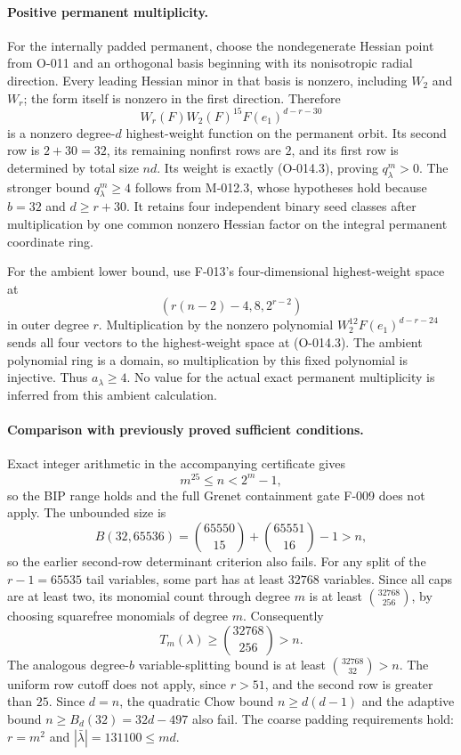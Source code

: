 \paragraph{Positive permanent multiplicity.}
For the internally padded permanent, choose the nondegenerate
Hessian point from O-011 and an orthogonal basis beginning
with its nonisotropic radial direction. Every leading Hessian
minor in that basis is nonzero, including $W_2$ and $W_r$;
the form itself is nonzero in the first direction. Therefore
\[
                    W_r(F)W_2(F)^{15}F(e_1)^{d-r-30}
                                                               \tag{O-014.6}
\]
is a nonzero degree-$d$ highest-weight function on the
permanent orbit. Its second row is $2+30=32$, its remaining
nonfirst rows are $2$, and its first row is determined by
total size $nd$. Its weight is exactly (O-014.3), proving
$q^m_\lambda>0$. The stronger bound $q^m_\lambda\geq4$
follows from M-012.3, whose hypotheses hold because $b=32$
and $d\geq r+30$. It retains four independent binary seed
classes after multiplication by one common nonzero Hessian
factor on the integral permanent coordinate ring.

For the ambient lower bound, use F-013's four-dimensional
highest-weight space at
\[
                    (r(n-2)-4,8,2^{r-2})
\]
in outer degree $r$. Multiplication by the nonzero polynomial
$W_2^{12}F(e_1)^{d-r-24}$ sends all four vectors to the
highest-weight space at (O-014.3). The ambient polynomial
ring is a domain, so multiplication by this fixed polynomial
is injective. Thus $a_\lambda\geq4$. No value for the actual
exact permanent multiplicity is inferred from this ambient calculation.

\paragraph{Comparison with previously proved sufficient conditions.}
Exact integer arithmetic in the accompanying certificate gives
\[
                   m^{25}\leq n<2^m-1,
\]
so the BIP range holds and the full Grenet containment gate
F-009 does not apply. The unbounded size is
\[
B(32,65536)=\binom{65550}{15}+\binom{65551}{16}-1>n,
\]
so the earlier second-row determinant criterion also fails.
For any split of the $r-1=65535$ tail variables, some part
has at least $32768$ variables. Since all caps are at least
two, its monomial count through degree $m$ is at least
$\binom{32768}{256}$, by choosing squarefree monomials of
degree $m$. Consequently
\[
        T_m(\lambda)\geq\binom{32768}{256}>n.
\]
The analogous degree-$b$ variable-splitting bound is at least
$\binom{32768}{32}>n$. The uniform row cutoff does not apply,
since $r>51$, and the second row is greater than $25$.
Since $d=n$, the quadratic Chow bound $n\geq d(d-1)$
and the adaptive bound $n\geq B_d(32)=32d-497$ also fail.
The coarse padding requirements hold: $r=m^2$ and
$|\bar\lambda|=131100\leq md$.

